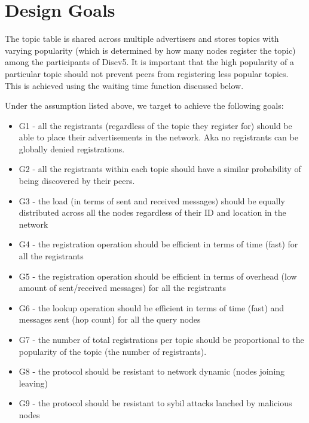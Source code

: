 
\section{Design Goals}\label{sec:goals}

The topic table is shared across multiple advertisers and stores topics with varying popularity (which is determined by how many nodes register the topic) among the participants of Discv5. It is important that the high popularity of a particular topic should not prevent peers from registering less popular topics. This is achieved using the waiting time function discussed below.



Under the assumption listed above, we target to achieve the following goals:
\begin{itemize}
    \item G1 - all the registrants (regardless of the topic they register for) should be able to place their advertisements in the network. Aka no registrants can be globally denied registrations.
    \item G2 - all the registrants within each topic should have a similar probability of being discovered by their peers.
    \item G3 - the load (in terms of sent and received messages) should be equally distributed across all the nodes regardless of their ID and location in the network
    \item G4 - the registration operation should be efficient in terms of time (fast) for all the registrants
    \item G5 - the registration operation should be efficient in terms of overhead (low amount of sent/received messages) for all the registrants
    \item G6 - the lookup operation should be efficient in terms of time (fast) and messages sent (hop count) for all the query nodes
    \item G7 - the number of total registrations per topic should be proportional to the popularity of the topic (the number of registrants).
    \item G8 - the protocol should be resistant to network dynamic (nodes joining leaving)
    \item G9 - the protocol should be resistant to sybil attacks lanched by malicious nodes
\end{itemize}